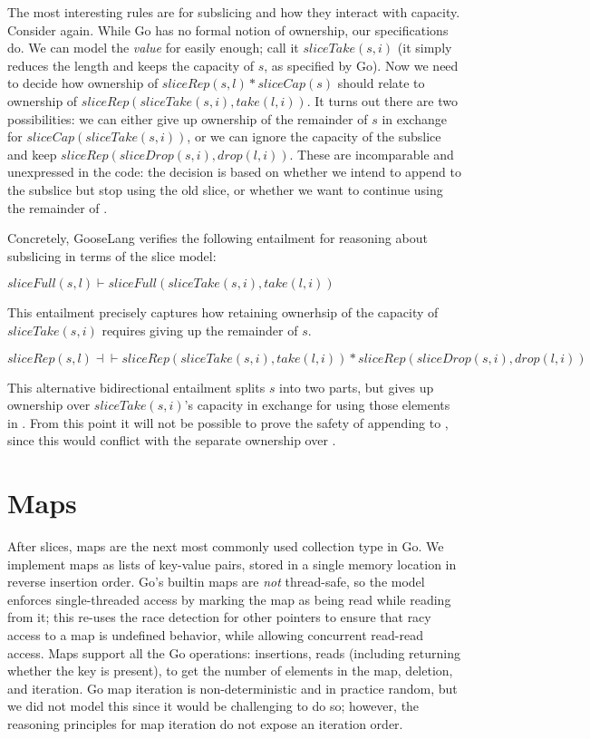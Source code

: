 The most interesting rules are for subslicing and how they interact with
capacity. Consider  again. While Go has no formal
notion of ownership, our specifications do. We can model the
\emph{value} for  easily enough; call it
$sliceTake(s, i)$ (it simply reduces the length and keeps the capacity
of $s$, as specified by Go). Now we need to decide how ownership of
$sliceRep(s, l) * sliceCap(s)$ should relate to ownership of
$sliceRep(sliceTake(s, i), take(l, i))$. It turns out there are two
possibilities: we can either give up ownership of the remainder of $s$
in exchange for $sliceCap(sliceTake(s, i))$, or we can ignore the
capacity of the subslice and keep
$sliceRep(sliceDrop(s, i), drop(l, i))$. These are incomparable and
unexpressed in the code: the decision is based on whether we intend to
append to the subslice but stop using the old slice, or whether we want
to continue using the remainder of .

Concretely, GooseLang verifies the following entailment for reasoning
about subslicing in terms of the slice model:

$sliceFull(s, l) \vdash sliceFull(sliceTake(s, i), take(l, i))$

This entailment precisely captures how retaining ownerhsip of the
capacity of $sliceTake(s, i)$ requires giving up the remainder of
$s$.

$sliceRep(s, l) \dashv\vdash sliceRep(sliceTake(s, i), take(l, i)) * sliceRep(sliceDrop(s, i), drop(l, i))$

This alternative bidirectional entailment splits $s$ into two parts,
but gives up ownership over $sliceTake(s, i)$'s capacity in exchange
for using those elements in . From this point it will
not be possible to prove the safety of appending to ,
since this would conflict with the separate ownership over
.

\section{Maps}

After slices, maps are the next most commonly used collection type in
Go. We implement maps as lists of key-value pairs, stored in a single
memory location in reverse insertion order. Go's builtin maps are
\emph{not} thread-safe, so the model enforces single-threaded access by
marking the map as being read while reading from it; this re-uses the
race detection for other pointers to ensure that racy access to a map is
undefined behavior, while allowing concurrent read-read access. Maps
support all the Go operations: insertions, reads (including returning
whether the key is present),  to get the number of elements
in the map, deletion, and iteration. Go map iteration is
non-deterministic and in practice random, but we did not model this
since it would be challenging to do so; however, the reasoning
principles for map iteration do not expose an iteration order.

